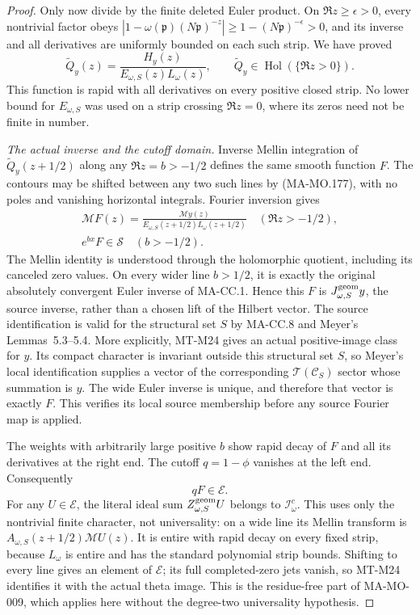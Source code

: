 \begin{proof}
Only now divide by the finite deleted Euler product. On
\(\Re z\ge\epsilon>0\), every nontrivial factor obeys
\(|1-\omega(\mathfrak p)(N\mathfrak p)^{-z}|
\ge1-(N\mathfrak p)^{-\epsilon}>0\), and its inverse and
all derivatives are uniformly bounded on each such strip.
We have proved
\[
 \widetilde Q_y(z)=\frac{H_y(z)}{E_{\omega,S}(z)L_\omega(z)},
 \qquad \widetilde Q_y\in\operatorname{Hol}(\{\Re z>0\}).
 \tag{MA-MO.177}
\]
This function is rapid with all derivatives on every positive closed
strip. No lower bound for \(E_{\omega,S}\) was used on a strip crossing
\(\Re z=0\), where its zeros need not be finite in number.

\emph{The actual inverse and the cutoff domain.}
Inverse Mellin integration of
\(\widetilde Q_y(z+1/2)\) along any \(\Re z=b>-1/2\)
defines the same smooth function \(F\). The contours may be
shifted between any two such lines by (MA-MO.177), with no
poles and vanishing horizontal integrals. Fourier inversion
gives
\[
 \begin{gathered}
 \mathcal MF(z)=\frac{\mathcal My(z)}
                   {E_{\omega,S}(z+1/2)L_\omega(z+1/2)}
                  \quad(\Re z>-1/2),\\
             e^{bx}F\in\mathscr S\quad(b>-1/2).
 \end{gathered}
 \tag{MA-MO.178}
\]
The Mellin identity is understood through the holomorphic
quotient, including its canceled zero values. On every wider
line \(b>1/2\), it is exactly the original absolutely
convergent Euler inverse of MA-CC.1. Hence this \(F\) is
\(J^{\rm geom}_{\omega,S}y\), the source inverse, rather
than a chosen lift of the Hilbert vector. The source
identification is valid for the structural set \(S\) by
MA-CC.8 and Meyer's Lemmas~5.3--5.4.
More explicitly, MT-M24 gives an actual positive-image class for
\(y\). Its compact character is invariant outside this structural
set \(S\), so Meyer's local identification supplies a vector of
the corresponding \(\mathcal T(\mathcal C_S)\) sector whose
summation is \(y\). The wide Euler inverse is unique, and
therefore that vector is exactly \(F\). This verifies its local
source membership before any source Fourier map is applied.

The weights with arbitrarily large positive \(b\) show
rapid decay of \(F\) and all its derivatives at the right
end. The cutoff \(q=1-\phi\) vanishes at the left end.
Consequently
\[
                           qF\in\mathcal E.
 \tag{MA-MO.179}
\]
For any \(U\in\mathcal E\), the literal ideal sum
\(Z^{\rm geom}_{\omega,S}U\) belongs to
\(\mathscr I^c_\omega\). This uses only the nontrivial
finite character, not universality: on a wide line its
Mellin transform is \(A_{\omega,S}(z+1/2)\mathcal MU(z)\).
It is entire with rapid decay on every fixed strip, because
\(L_\omega\) is entire and has the standard polynomial
strip bounds. Shifting to every line gives an element of
\(\mathcal E\); its full completed-zero jets vanish, so
MT-M24 identifies it with the actual theta image. This is
the residue-free part of MA-MO-009, which applies here
without the degree-two universality hypothesis.


\end{proof}
